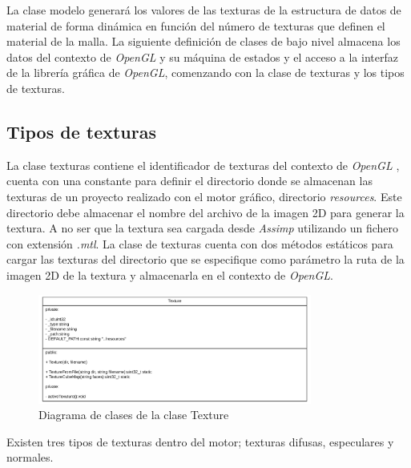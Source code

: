 \documentclass[a4paper]{book}
\begin{document}
La clase modelo generará los valores de las texturas de la estructura de datos de material de forma dinámica en función del número de
texturas que definen el material de la malla. La siguiente definición de clases de bajo nivel almacena los datos del contexto de
\textit{OpenGL} y su máquina de estados y el acceso a la interfaz de la librería gráfica de \textit{OpenGL}, comenzando con la clase de texturas
y los tipos de texturas.

\subsection{Tipos de texturas}
\label{subsec:Texturas}

La clase texturas contiene el identificador de texturas del contexto de \textit{OpenGL} , cuenta con una constante para definir el directorio
donde se almacenan las texturas de un proyecto realizado con el motor gráfico, directorio \textit{resources}. Este directorio debe almacenar el
nombre del archivo de la imagen 2D para generar la textura. A no ser que la textura sea cargada desde \textit{Assimp} utilizando un fichero
con extensión \textit{.mtl}. La clase de texturas cuenta con dos métodos estáticos para cargar las texturas del directorio que se especifique
como parámetro la ruta de la imagen 2D de la textura y almacenarla en el contexto de \textit{OpenGL}.

\begin{figure}[H]
    \centering
    \includegraphics[width=9cm, keepaspectratio]{img/Texture.png}
    \caption{Diagrama de clases de la clase Texture}
    \label{Texture}
\end{figure}

Existen tres tipos de texturas dentro del motor; texturas difusas, especulares y normales. \cite{art:_blinn1976texture}
\end{document}
